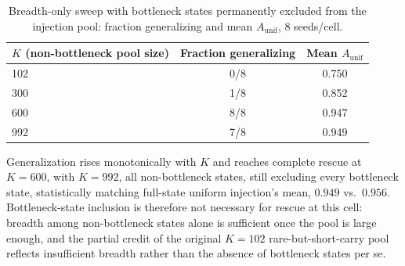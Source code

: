 \documentclass[11pt]{article}
\begin{document}
\begin{table}[h]
\centering
\caption{Breadth-only sweep with bottleneck states permanently excluded from the injection pool: fraction generalizing and mean $A_{\mathrm{unif}}$, 8 seeds/cell.}
\label{tab:breadth}
\begin{tabular}{lcc}
\toprule
$K$ (non-bottleneck pool size) & Fraction generalizing & Mean $A_{\mathrm{unif}}$ \\
\midrule
102 & 0/8 & 0.750 \\
300 & 1/8 & 0.852 \\
600 & 8/8 & 0.947 \\
992 & 7/8 & 0.949 \\
\bottomrule
\end{tabular}
\end{table}

Generalization rises monotonically with $K$ and reaches complete rescue at $K=600$, with $K=992$, all non-bottleneck states, still excluding every bottleneck state, statistically matching full-state uniform injection's mean, $0.949$ vs.\ $0.956$. Bottleneck-state inclusion is therefore not necessary for rescue at this cell: breadth among non-bottleneck states alone is sufficient once the pool is large enough, and the partial credit of the original $K=102$ rare-but-short-carry pool reflects insufficient breadth rather than the absence of bottleneck states per se.
\end{document}
